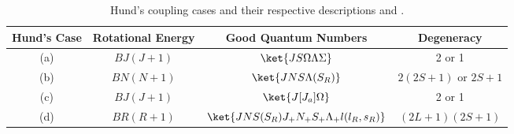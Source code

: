 \begin{table}[H]
    \centering
    \caption{Hund's coupling cases and their respective descriptions \cite[2]{hougenCalculationRotationalEnergy1970} and \cite[103]{lefebvre-brionSpectraDynamicsDiatomic2004}.}
    \begin{tabular}{cccc}
        \toprule
        \textbf{Hund's Case} & \textbf{Rotational Energy} & \textbf{Good Quantum Numbers}                 & \textbf{Degeneracy}     \\
        \midrule
        (a)                  & $BJ(J + 1)$                & $\ket{JS\Omega\Lambda\Sigma}$                 & 2 or 1                  \\
        (b)                  & $BN(N + 1)$                & $\ket{JNS\Lambda(S_R)}$                       & $2(2S + 1)$ or $2S + 1$ \\
        (c)                  & $BJ(J + 1)$                & $\ket{J[J_a]\Omega}$                          & 2 or 1                  \\
        (d)                  & $BR(R + 1)$                & $\ket{JNS(S_R)J_+N_+S_+\Lambda_+l(l_R, s_R)}$ & $(2L + 1)(2S + 1)$      \\
        \bottomrule
    \end{tabular}
\end{table}

